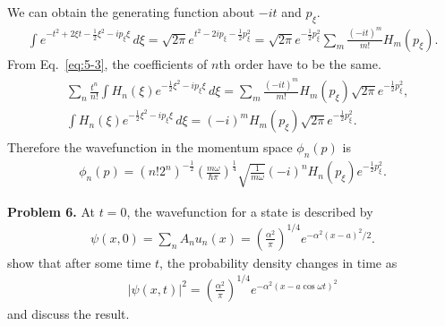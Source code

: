 \documentclass[floatfix,nofootinbib,superscriptaddress,fleqn]{revtex4-2}
\begin{document}
We can obtain the generating function about $-it$ and $p_\xi$.
\begin{align}
  \int e^{-t^2 +2\xi t-\frac{1}{2}\xi^2 -i p_\xi\xi } \,d\xi
  =\sqrt{2\pi}e^{t^2-2ip_\xi-\frac{1}{2}p^2_\xi}
  =\sqrt{2\pi}e^{-\frac{1}{2}p^2_\xi}
  \sum_m\frac{\left(-it\right)^m}{m!}H_m(p_\xi).
\end{align}
From Eq.~\eqref{eq:5-3}, the coefficients of $n$th order 
have to be the same.
\begin{align}
  \begin{split}
    &\sum_n \frac{t^n}{n!}\int H_n(\xi)
    e^{-\frac{1}{2}\xi^2 -i p_\xi\xi }\, d\xi
    =\sum_m\frac{\left(-it\right)^m}{m!}H_m(p_\xi)
    \sqrt{2\pi}e^{-\frac{1}{2}p^2_\xi},  \\
    &\int H_n(\xi)
    e^{-\frac{1}{2}\xi^2 -i p_\xi\xi }\, d\xi
    =(-i)^mH_m(p_\xi)
    \sqrt{2\pi}e^{-\frac{1}{2}p^2_\xi}.
  \end{split}
\end{align}
Therefore the wavefunction in the momentum space $\phi_n(p)$ is
\begin{align}
  \phi_n(p) = (n!2^n)^{-\frac{1}{2}}
  \left(\frac{m\omega}{\hbar\pi}\right)^{\frac{1}{4}}
  \sqrt{\frac{1}{m\omega }}(-i)^nH_n(p_\xi)
  e^{-\frac{1}{2}p^2_\xi}.
\end{align}
\vspace{1cm}

\noindent \textbf{Problem 6.}
At $t=0$, the wavefunction for a state is described by
\begin{align}\label{eq:6-1}
\psi(x,0) = \sum_n A_n u_n(x) =
  \left(\frac{\alpha^2}{\pi}\right)^{1/4} e^{-\alpha^2(x-a)^2/2}  .
\end{align}
show that after some time $t$, the probability density changes in time
as 
\begin{align}\label{eq:6-2}
|\psi(x,t)|^2  =  \left(\frac{\alpha^2}{\pi}\right)^{1/4}e^{-\alpha^2
  (x-a\cos\omega t)^2}
\end{align}
and discuss the result. 
\end{document}
